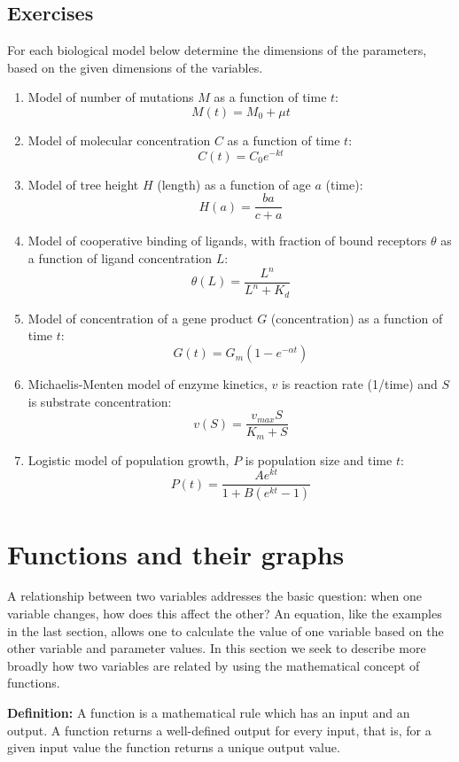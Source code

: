 \documentclass[
]{book}
\begin{document}
\hypertarget{exercises}{%
\subsection{Exercises}\label{exercises}}

For each biological model below determine the dimensions of the parameters, based on the given dimensions of the variables.

\begin{enumerate}
\def\labelenumi{\arabic{enumi}.}
\item
  Model of number of mutations \(M\) as a function of time \(t\):
  \[ M(t) = M_0 + \mu t\]
\item
  Model of molecular concentration \(C\) as a function of time \(t\):
  \[ C(t) = C_0 e^{-kt} \]
\item
  Model of tree height \(H\) (length) as a function of age \(a\) (time):
  \[ H(a) = \frac{b a}{c + a}\]
\item
  Model of cooperative binding of ligands, with fraction of bound receptors \(\theta\) as a function of ligand concentration \(L\):
  \[ \theta (L) = \frac{L^n}{L^n + K_d}\]
\item
  Model of concentration of a gene product \(G\) (concentration) as a function of time \(t\):
  \[ G(t) = G_m (1 - e^{-\alpha t})\]
\item
  Michaelis-Menten model of enzyme kinetics, \(v\) is reaction rate (1/time) and \(S\) is substrate concentration:
  \[ v(S) = \frac{v_{max} S}{K_m + S}\]
\item
  Logistic model of population growth, \(P\) is population size and time \(t\):
  \[ P(t) = \frac{A e^{kt}}{1 + B(e^{kt} -1)} \]
\end{enumerate}

\hypertarget{sec:math2}{%
\section{Functions and their graphs}\label{sec:math2}}

A relationship between two variables addresses the basic question: when one variable changes, how does this affect the other? An equation, like the examples in the last section, allows one to calculate the value of one variable based on the other variable and parameter values. In this section we seek to describe more broadly how two variables are related by using the mathematical concept of functions.

\textbf{Definition:} A  function is a mathematical rule which has an input and an output. A function returns a well-defined output for every input, that is, for a given input value the function returns a unique output value.
\end{document}
